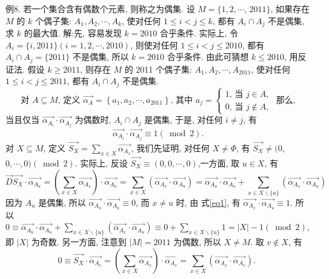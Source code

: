例8. 若一个集合含有偶数个元素, 则称之为偶集.
设 $M=\{1,2, \cdots$, $2011\}$, 如果存在 $M$ 的 $k$ 个偶子集: $A_1, A_2, \cdots, A_k$, 使对任何 $1 \leqslant i<j \leqslant k$, 都有 $A_i \cap A_j$ 不是偶集,求 $k$ 的最大值.
解:先, 容易发现 $k=2010$ 合乎条件.
实际上, 令 $A_i=\{i, 2011\}(i= 1,2, \cdots, 2010)$, 则使对任何 $1 \leqslant i<j \leqslant 2010$, 都有 $A_i \cap A_j=\{2011\}$ 不是偶集, 所以 $k=2010$ 合乎条件.
由此可猜想 $k \leqslant 2010$, 用反证法.
假设 $k \geqslant 2011$, 则存在 $M$ 的 2011 个偶子集: $A_1, A_2, \cdots, A_{2011}$, 使对任何 $1 \leqslant i<j \leqslant 2011$, 都有 $A_i \cap A_j$ 不是偶集.
$$
\text { 对 } A \subseteq M \text {, 定义 } \overrightarrow{\alpha_A}=\left\{a_1, a_2, \cdots, a_{2011}\right\} \text {, 其中 } a_j=\left\{\begin{array}{l}
1 \text {, 当 } j \in A, \\
0 \text {, 当 } j \notin A,
\end{array}\right. \text { 那么, }
$$
当且仅当 $\overrightarrow{\alpha_{A_i}} \cdot \overrightarrow{\alpha_{A_j}}$ 为偶数时, $A_i \cap A_j$ 是偶集, 于是, 对任何 $i \neq j$, 有
$$
\overrightarrow{\alpha_{A_i}} \cdot \overrightarrow{\alpha_{A_j}} \equiv 1(\bmod 2) . \label{eq1}
$$
对 $X \subseteq M$, 定义 $\overrightarrow{S_X}=\sum_{x \in X} \overrightarrow{\alpha_{A_x}}$, 我们先证明, 对任何 $X \neq \Phi$, 有 $\overrightarrow{S_X} \neq(0$, $0, \cdots, 0)(\bmod 2)$.
实际上, 反设 $\overrightarrow{S_X} \equiv(0,0, \cdots, 0)$,一方面, 取 $u \in X$, 有
$$
\vec{D} \overrightarrow{S_X} \cdot \overrightarrow{\alpha_{A_u}}=\left(\sum_{x \in X} \overrightarrow{\alpha_{A_x}}\right) \cdot \overrightarrow{\alpha_{A_u}}=\sum_{x \in X}\left(\overrightarrow{\alpha_{A_x}} \cdot \overrightarrow{\alpha_{A_u}}\right)=\overrightarrow{\alpha_{A_u}} \cdot \overrightarrow{\alpha_{A_u}}+\sum_{x \in X \backslash\{u\}}\left(\overrightarrow{\alpha_{A_x}} \cdot \overrightarrow{\alpha_{A_u}}\right)
$$
因为 $A_u$ 是偶集, 所以 $\overrightarrow{\alpha_{A_u}} \cdot \overrightarrow{\alpha_{A_u}} \equiv 0$, 而 $x \neq u$ 时, 由  式\ref{eq1}, 有 $\overrightarrow{\alpha_{A_x}} \cdot \overrightarrow{\alpha_{A_u}} \equiv 1$.
所以 $0 \equiv \overrightarrow{\alpha_{A_u}} \cdot \overrightarrow{\alpha_{A_u}}+\sum_{x \in X \backslash\{u\}}\left(\overrightarrow{\alpha_{A_x}} \cdot \overrightarrow{\alpha_{A_u}}\right) \equiv 0+\sum_{x \in X \backslash\{u\}} 1=|X|-1(\bmod 2)$, 即 $|X|$ 为奇数.
另一方面, 注意到 $|M|=2011$ 为偶数, 所以 $X \neq M$. 取 $v \notin X$, 有
$$
0 \equiv \overrightarrow{S_X} \cdot \overrightarrow{\alpha_{A_v}}=\left(\sum_{x \in X} \overrightarrow{\alpha_{A_x}}\right) \cdot \overrightarrow{\alpha_{A_v}}=\sum_{x \in X}\left(\overrightarrow{\alpha_{A_x}} \cdot \overrightarrow{\alpha_{A_v}}\right) \text {. }
$$
